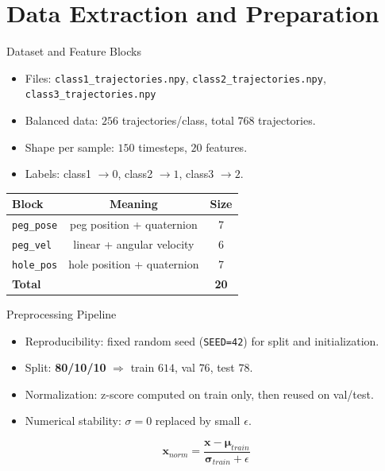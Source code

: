 \section{Data Extraction and Preparation}
\begin{frame}{Dataset and Feature Blocks}
\small
\begin{itemize}[<+->]
  \item Files: \texttt{class1\_trajectories.npy}, \texttt{class2\_trajectories.npy}, \texttt{class3\_trajectories.npy}
  \item Balanced data: \(256\) trajectories/class, total \(768\) trajectories.
  \item Shape per sample: \(150\) timesteps, \(20\) features.
  \item Labels: class1 \(\rightarrow 0\), class2 \(\rightarrow 1\), class3 \(\rightarrow 2\).
\end{itemize}
\vspace{0.3em}
\small
\begin{tabular}{lcc}
\toprule
\textbf{Block} & \textbf{Meaning} & \textbf{Size} \\
\midrule
\texttt{peg\_pose} & peg position + quaternion & 7 \\
\texttt{peg\_vel} & linear + angular velocity & 6 \\
\texttt{hole\_pos} & hole position + quaternion & 7 \\
\midrule
\textbf{Total} &  & \textbf{20} \\
\bottomrule
\end{tabular}
\end{frame}

\begin{frame}{Preprocessing Pipeline}
\small
\begin{itemize}[<+->]
  \item Reproducibility: fixed random seed (\texttt{SEED=42}) for split and initialization.
  \item Split: \textbf{80/10/10} \(\Rightarrow\) train \(614\), val \(76\), test \(78\).
  \item Normalization: z-score computed on train only, then reused on val/test.
  \item Numerical stability: \(\sigma = 0\) replaced by small \(\epsilon\).
\end{itemize}
\vspace{-0.1em}
\[
\mathbf{x}_{norm} = \frac{\mathbf{x}-\boldsymbol{\mu}_{train}}{\boldsymbol{\sigma}_{train}+\epsilon}
\]
\vspace{-0.2em}
\small
\end{frame}

